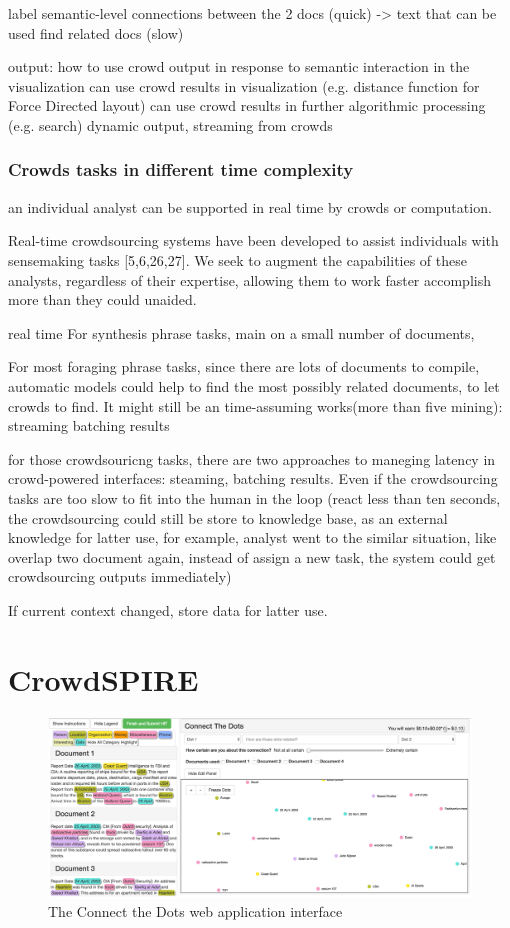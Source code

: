 \documentclass[journal]{vgtc}                %
\begin{document}
label semantic-level connections between the 2 docs (quick) -> text that can be used
find related docs (slow)

output:  how to use crowd output in response to semantic interaction in the visualization
can use crowd results in visualization (e.g. distance function for Force Directed layout)
can use crowd results in further algorithmic processing (e.g. search)
dynamic output, streaming from crowds

\subsubsection{Crowds tasks in different time complexity}

an individual analyst can be supported in real time by crowds or computation.

Real-time crowdsourcing systems have been developed to assist individuals with sensemaking tasks [5,6,26,27].
We seek to augment the capabilities of these analysts, regardless of their expertise, allowing them to work faster accomplish more than they could unaided.

real time
For synthesis phrase tasks, main on a small number of documents,

For most foraging phrase tasks, since there are lots of documents to compile, automatic models could help to find the most possibly related documents, to let crowds to find. It might still be an time-assuming works(more than five mining):
streaming
batching results

for those crowdsouricng tasks, there are two approaches to maneging latency in crowd-powered interfaces: steaming, batching results.
Even if the crowdsourcing tasks are too slow to fit into the human in the loop (react less than ten seconds, the crowdsourcing could still be store to knowledge base, as an external knowledge for latter use, for example, analyst went to the similar situation, like overlap two document again, instead of assign a new task, the system could get crowdsourcing outputs immediately)


If current context changed, store data for latter use.


\section{CrowdSPIRE}
\begin{figure}
 \centering
  \includegraphics[width=\textwidth]{Hit}
 \caption{The Connect the Dots web application interface}
 \label{fig:hit}
\end{figure}
\end{document}
